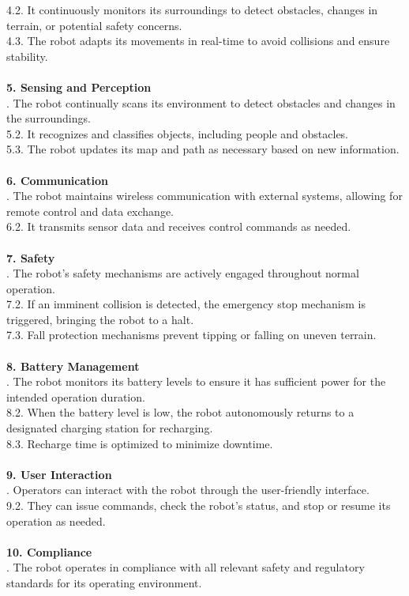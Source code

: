 \documentclass[12pt]{article}
\begin{document}
4.2. It continuously monitors its surroundings to detect obstacles, changes in terrain, or potential safety concerns.\\
4.3. The robot adapts its movements in real-time to avoid collisions and ensure stability.\\\\
\noindent\textbf{5. Sensing and Perception}\\
. The robot continually scans its environment to detect obstacles and changes in the surroundings.\\
5.2. It recognizes and classifies objects, including people and obstacles.\\
5.3. The robot updates its map and path as necessary based on new information.\\\\
\noindent\textbf{6. Communication}\\
. The robot maintains wireless communication with external systems, allowing for remote control and data exchange.\\
6.2. It transmits sensor data and receives control commands as needed.\\\\
\noindent\textbf{7. Safety}\\
. The robot's safety mechanisms are actively engaged throughout normal operation.\\
7.2. If an imminent collision is detected, the emergency stop mechanism is triggered, bringing the robot to a halt.\\
7.3. Fall protection mechanisms prevent tipping or falling on uneven terrain.\\\\
\noindent\textbf{8. Battery Management}\\
. The robot monitors its battery levels to ensure it has sufficient power for the intended operation duration.\\
8.2. When the battery level is low, the robot autonomously returns to a designated charging station for recharging.\\
8.3. Recharge time is optimized to minimize downtime.\\\\
\noindent\textbf{9. User Interaction}\\
. Operators can interact with the robot through the user-friendly interface.\\
9.2. They can issue commands, check the robot's status, and stop or resume its operation as needed.\\\\
\noindent\textbf{10. Compliance}\\
. The robot operates in compliance with all relevant safety and regulatory standards for its operating environment.
\end{document}
